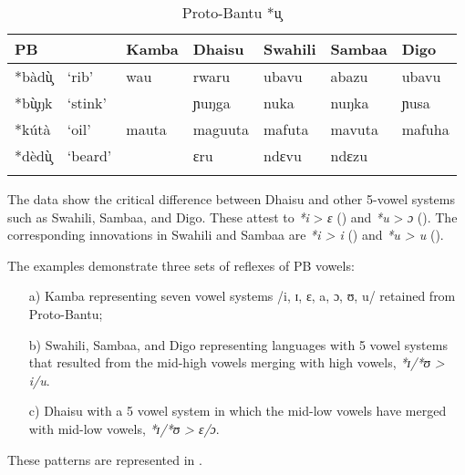 \documentclass[output=paper,colorlinks,citecolor=brown]{langscibook}
\begin{document}
\begin{table}
    \caption{Proto-Bantu *u̧}
    \label{tab:ngonyani:12}
    \begin{tabular}{@{}p{1cm} p{1.3cm} p{1.3cm} p{1.3cm} p{1.3cm} p{1.3cm} p{1.3cm}@{}}
    \lsptoprule
        PB & & Kamba & Dhaisu & Swahili & Sambaa & Digo \\
        \midrule
        *bàdù̧  & `rib' & wau & rwaru  & ubavu & abazu & ubavu \\
        *bù̧ŋk & `stink' &  & ɲuŋga & nuka & nuŋka & ɲusa\\
        *kútà & `oil' & mauta & maguuta & mafuta & mavuta & mafuha\\
        *dèdù̧ & `beard' &  & ɛru & ndɛvu & ndɛzu & \\
    \lspbottomrule
    \end{tabular}
\end{table}

The data show the critical difference between Dhaisu and other 5-vowel systems such as Swahili, Sambaa, and Digo. These attest to \textit{*i} > \textit{ɛ} () and  \textit{*u} >  \textit{ɔ} (). The corresponding innovations in Swahili and Sambaa are \textit{*i > i} () and \textit{*u > u} ().

The examples demonstrate three sets of reflexes of PB vowels:

\begin{enumerate}
    \item[a)] Kamba representing seven vowel systems /i, ɪ, ɛ, a, ɔ, ʊ, u/ retained from Proto-Bantu; 
    \item[b)] Swahili, Sambaa, and Digo representing languages with 5 vowel systems that resulted from the mid-high vowels merging with high vowels,  \textit{ *ɪ/*ʊ >  i/u}.
    \item[c)] Dhaisu with a 5 vowel system in which the mid-low vowels have merged with mid-low vowels, \textit{*ɪ/*ʊ > ɛ/ɔ}.
\end{enumerate}

\noindent These patterns are represented in .
\end{document}
